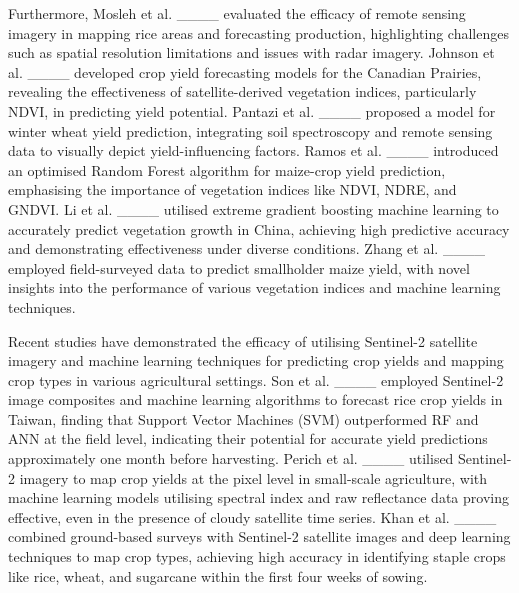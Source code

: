 Furthermore, Mosleh et al. ____ evaluated the efficacy of remote sensing imagery in mapping rice areas and forecasting production, highlighting challenges such as spatial resolution limitations and issues with radar imagery. Johnson et al. ____ developed crop yield forecasting models for the Canadian Prairies, revealing the effectiveness of satellite-derived vegetation indices, particularly NDVI, in predicting yield potential. Pantazi et al. ____ proposed a model for winter wheat yield prediction, integrating soil spectroscopy and remote sensing data to visually depict yield-influencing factors. Ramos et al. ____ introduced an optimised Random Forest algorithm for maize-crop yield prediction, emphasising the importance of vegetation indices like NDVI, NDRE, and GNDVI. Li et al. ____ utilised extreme gradient boosting machine learning to accurately predict vegetation growth in China, achieving high predictive accuracy and demonstrating effectiveness under diverse conditions. Zhang et al. ____ employed field-surveyed data to predict smallholder maize yield, with novel insights into the performance of various vegetation indices and machine learning techniques.

Recent studies have demonstrated the efficacy of utilising Sentinel-2 satellite imagery and machine learning techniques for predicting crop yields and mapping crop types in various agricultural settings. Son et al. ____ employed Sentinel-2 image composites and machine learning algorithms to forecast rice crop yields in Taiwan, finding that Support Vector Machines (SVM) outperformed RF and ANN at the field level, indicating their potential for accurate yield predictions approximately one month before harvesting. Perich et al. ____ utilised Sentinel-2 imagery to map crop yields at the pixel level in small-scale agriculture, with machine learning models utilising spectral index and raw reflectance data proving effective, even in the presence of cloudy satellite time series. Khan et al. ____ combined ground-based surveys with Sentinel-2 satellite images and deep learning techniques to map crop types, achieving high accuracy in identifying staple crops like rice, wheat, and sugarcane within the first four weeks of sowing. 

